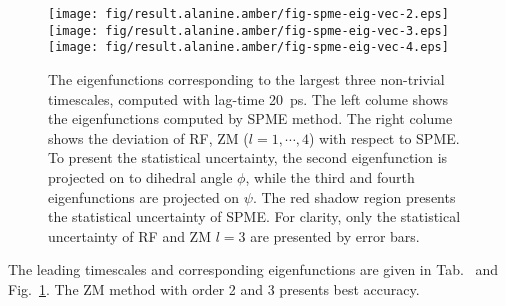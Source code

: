 \documentclass[aip,jcp,a4paper,reprint,unsortedaddress,onecolumn,fleqn]{revtex4-1}
\begin{document}
\begin{figure}
  \centering
  \texttt{[image: fig/result.alanine.amber/fig-spme-eig-vec-2.eps]}
  \\
  \texttt{[image: fig/result.alanine.amber/fig-spme-eig-vec-3.eps]}
  \\
  \texttt{[image: fig/result.alanine.amber/fig-spme-eig-vec-4.eps]}
  \\
  \caption{The eigenfunctions corresponding to the largest three
    non-trivial timescales, computed with lag-time 20~ps.  The left
    colume shows the eigenfunctions computed by SPME method. The right colume
    shows the deviation of RF, ZM ($l=1,\cdots,4$) with respect to
    SPME.  To present the statistical uncertainty, the second
    eigenfunction is projected on to dihedral angle $\phi$, while the
    third and fourth eigenfunctions are projected on $\psi$.  The red
    shadow region presents the statistical uncertainty of SPME. For
    clarity, only the statistical uncertainty of RF and ZM $l=3$ are
    presented by error bars.  }
  \label{fig:tmp5}
\end{figure}


The leading timescales and corresponding eigenfunctions are given in
Tab.~\label{tab:tmp3} and Fig.~\ref{fig:tmp5}. The ZM method with
order 2 and 3 presents best accuracy.



\newpage
{}

\end{document}
